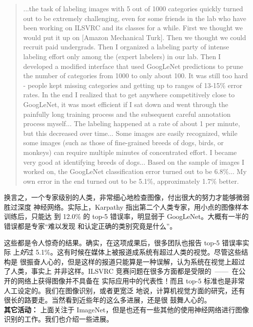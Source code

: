 \begin{quote}
  ...the task of labeling images with 5 out of 1000 categories quickly turned
  out to be extremely challenging, even for some friends in the lab who have
  been working on ILSVRC and its classes for a while. First we thought we would
  put it up on [Amazon Mechanical Turk]. Then we thought we could recruit paid
  undergrads. Then I organized a labeling party of intense labeling effort only
  among the (expert labelers) in our lab. Then I developed a modified interface
  that used GoogLeNet predictions to prune the number of categories from 1000 to
  only about 100. It was still too hard - people kept missing categories and
  getting up to ranges of 13-15\% error rates. In the end I realized that to get
  anywhere competitively close to GoogLeNet, it was most efficient if I sat down
  and went through the painfully long training process and the subsequent
  careful annotation process myself... The labeling happened at a rate of about
  1 per minute, but this decreased over time... Some images are easily
  recognized, while some images (such as those of fine-grained breeds of dogs,
  birds, or monkeys) can require multiple minutes of concentrated effort. I
  became very good at identifying breeds of dogs... Based on the sample of
  images I worked on, the GoogLeNet classification error turned out to be
  6.8\%... My own error in the end turned out to be 5.1\%, approximately 1.7\%
  better.
\end{quote}

换言之，一个专家级别的人类，非常细心地检查图像，付出很大的努力才能够微弱胜过深度
神经网络。实际上，Karpathy 指出第二个人类专家，用小点的图像样本训练后，只能达
到 12.0\% 的 top-5 错误率，明显弱于 GoogLeNet。大概有一半的错误都是专家“难以发现
和认定正确的类别究竟是什么”。

这些都是令人惊奇的结果。确实，在这项成果后，很多团队也报告 top-5 错误率实际
上\emph{好}过 5.1\%。这有时候在媒体上被报道成系统有超过人类的视觉。尽管这些结构是
很振奋人心的，但是这样的报道只能算是一种误解，认为系统在视觉上超过了人类，事实上
并非这样。ILSVRC 竞赛问题在很多方面都是受限的~——~在公开的网络上获得图像并不具备在
实际应用中的代表性！而且 top-5 标准也是非常人工设定的。我们在图像识别，或者更宽泛
地说，计算机视觉方面的研究，还有很长的路要走。当然看到近些年的这么多进展，还是很
鼓舞人心的。\\

\textbf{其它活动：} 上面关注于 ImageNet，但是也还有一些其他的使用神经网络进行图像
识别的工作。我们也介绍一些进展。

